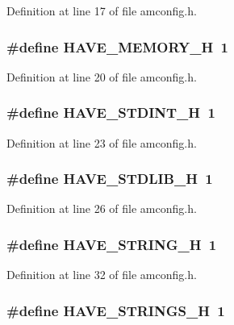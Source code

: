 Definition at line 17 of file amconfig.h.
\subsubsection[{HAVE\_\-MEMORY\_\-H}]{\setlength{\rightskip}{0pt plus 5cm}\#define HAVE\_\-MEMORY\_\-H~1}\label{amconfig_8h_ae93a78f9d076138897af441c9f86f285}


Definition at line 20 of file amconfig.h.
\subsubsection[{HAVE\_\-STDINT\_\-H}]{\setlength{\rightskip}{0pt plus 5cm}\#define HAVE\_\-STDINT\_\-H~1}\label{amconfig_8h_ab6cd6d1c63c1e26ea2d4537b77148354}


Definition at line 23 of file amconfig.h.
\subsubsection[{HAVE\_\-STDLIB\_\-H}]{\setlength{\rightskip}{0pt plus 5cm}\#define HAVE\_\-STDLIB\_\-H~1}\label{amconfig_8h_a9e0e434ec1a6ddbd97db12b5a32905e0}


Definition at line 26 of file amconfig.h.
\subsubsection[{HAVE\_\-STRING\_\-H}]{\setlength{\rightskip}{0pt plus 5cm}\#define HAVE\_\-STRING\_\-H~1}\label{amconfig_8h_ad4c234dd1625255dc626a15886306e7d}


Definition at line 32 of file amconfig.h.
\subsubsection[{HAVE\_\-STRINGS\_\-H}]{\setlength{\rightskip}{0pt plus 5cm}\#define HAVE\_\-STRINGS\_\-H~1}\label{amconfig_8h_a405d10d46190bcb0320524c54eafc850}


